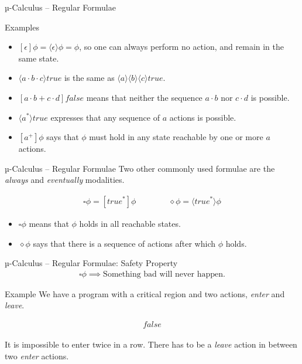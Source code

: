 \documentclass[aspectratio=1610]{beamer}
\begin{document}
  \begin{frame}{µ-Calculus – Regular Formulae}
    \begin{exampleblock}{Examples}
      \begin{itemize}
        \item $[\epsilon]\phi = \langle\epsilon\rangle\phi = \phi$, so one can always perform no action, and remain in the same state.
        \item $\langle{a}\cdot{b}\cdot{c}\rangle\mathit{true}$ is the same as $\langle{a}\rangle\langle{b}\rangle\langle{c}\rangle\mathit{true}$.
        \item $[a\cdot{b} + c\cdot{d}]\mathit{false}$ means that neither the sequence $a\cdot{b}$ nor $c\cdot{d}$ is possible.
        \item $\langle{a^*}\rangle\mathit{true}$ expresses that any sequence of $a$ actions is possible.
        \item $[a^+]\phi$ says that $\phi$ must hold in any state reachable by one or more $a$ actions.
      \end{itemize}
    \end{exampleblock}
  \end{frame}

  \begin{frame}{µ-Calculus – Regular Formulae}
    Two other commonly used formulae are the \textit{always} and \textit{eventually} modalities.

    \begin{align*}
      \square\phi = [\mathit{true}^*]\phi \qquad\qquad    \diamond\phi = \langle\mathit{true}^*\rangle\phi
    \end{align*}

    \begin{itemize}
      \item $\square\phi$ means that $\phi$ holds in all reachable states.
      \item $\diamond\phi$ says that there is a sequence of actions after which $\phi$ holds.
    \end{itemize}
  \end{frame}

  \begin{frame}{µ-Calculus – Regular Formulae: Safety Property}
    \begin{align*}
      \square\phi \implies \text{Something bad will never happen.}
    \end{align*}

    \begin{exampleblock}{Example}
      We have a program with a critical region and two actions, \textit{enter} and \textit{leave}.

      \begin{align*}
        [\mathit{true}^*\cdot \mathit{enter} \cdot \overline{\mathit{leave}}^* \cdot \mathit{enter}]\mathit{false}
      \end{align*}

      It is impossible to enter twice in a row. There has to be a \textit{leave} action in between two \textit{enter} actions.
    \end{exampleblock}
  \end{frame}
\end{document}
